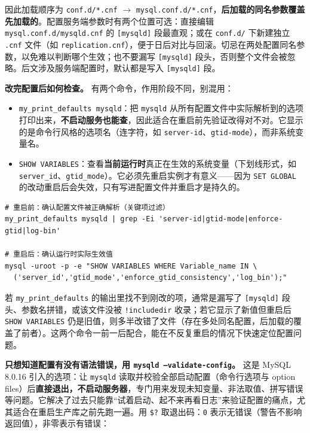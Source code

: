 \documentclass[12pt,UTF8]{ctexbook}
\begin{document}
因此加载顺序为 \texttt{conf.d/*.cnf} $\to$ \texttt{mysql.conf.d/*.cnf}，\textbf{后加载的同名参数覆盖先加载的}。配置服务端参数时有两个位置可选：直接编辑 \texttt{mysql.conf.d/mysqld.cnf} 的 \texttt{[mysqld]} 段最直观；或在 \texttt{conf.d/} 下新建独立 \texttt{.cnf} 文件（如 \texttt{replication.cnf}），便于日后对比与回滚。切忌在两处配置同名参数，以免难以判断哪个生效；也不要漏写 \texttt{[mysqld]} 段头，否则整个文件会被忽略。后文涉及服务端配置时，默认都是写入 \texttt{[mysqld]} 段。

\textbf{改完配置后如何检查。} 有两个命令，作用阶段不同，别混用：

\begin{itemize}[leftmargin=2cm]
  \item \texttt{my\_print\_defaults mysqld}：把 \texttt{mysqld} 从所有配置文件中实际解析到的选项打印出来，\textbf{不启动服务也能查}，因此适合在重启前先验证改得对不对。它显示的是命令行风格的选项名（连字符，如 \texttt{server-id}、\texttt{gtid-mode}），而非系统变量名。
  \item \texttt{SHOW VARIABLES}：查看\textbf{当前运行时}真正在生效的系统变量（下划线形式，如 \texttt{server\_id}、\texttt{gtid\_mode}）。它必须先重启实例才有意义——因为 \texttt{SET GLOBAL} 的改动重启后会失效，只有写进配置文件并重启才是持久的。
\end{itemize}

\begin{lstlisting}
# 重启前：确认配置文件被正确解析（关键项过滤）
my_print_defaults mysqld | grep -Ei 'server-id|gtid-mode|enforce-gtid|log-bin'

# 重启后：确认运行时实际生效值
mysql -uroot -p -e "SHOW VARIABLES WHERE Variable_name IN \
  ('server_id','gtid_mode','enforce_gtid_consistency','log_bin');"
\end{lstlisting}

若 \texttt{my\_print\_defaults} 的输出里找不到刚改的项，通常是漏写了 \texttt{[mysqld]} 段头、参数名拼错，或该文件没被 \texttt{!includedir} 收录；若它显示了新值但重启后 \texttt{SHOW VARIABLES} 仍是旧值，则多半改错了文件（存在多处同名配置，后加载的覆盖了前者）。这两个命令一前一后配合，能在不反复重启的情况下快速定位配置问题。

\textbf{只想知道配置有没有语法错误，用 \texttt{mysqld --validate-config}。} 这是 MySQL 8.0.16 引入的选项：让 \texttt{mysqld} 读取并校验全部启动配置（命令行选项与 option files）后\textbf{直接退出，不启动服务器}，专门用来发现未知变量、非法取值、拼写错误等问题。它解决了过去只能靠“试着启动、起不来再看日志”来验证配置的痛点，尤其适合在重启生产库之前先跑一遍。用 \texttt{\$?} 取退出码：\texttt{0} 表示无错误（警告不影响返回值），非零表示有错误：
\end{document}
